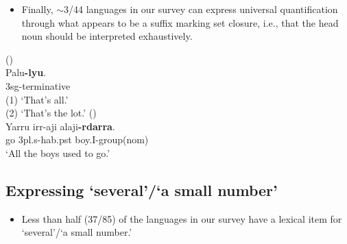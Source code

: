 \documentclass{article}
\makeatletter
\newcommand{\ofy}{/85} %
\makeatother
\begin{document}
\begin{itemize}
    \item Finally, $\sim$3/44 languages in our survey can express universal quantification through what appears to be a suffix marking set closure, i.e., that the head noun should be interpreted exhaustively. 
\end{itemize}

\begin{exe}
 (\citealt[158]{marsh92}) \\
\gll Palu\textbf{-lyu}.\\
3{\sc sg}-{\sc terminative}\\
\glt (1) `That's all.'\\
(2) `That's the lot.'
 (\citealt[80]{nordlinger98})\\
 \gll Yarru irr-aji  alaji\textbf{-rdarra}.\\
go  3{\sc pl.s-hab.pst} boy.I-{\sc group(nom)}\\
\glt `All the boys used to go.' 
\end{exe}


\subsection{Expressing `several'/`a small number'}

\begin{itemize}
    \item Less than half (37\ofy) of the languages in our survey have a lexical item for `several'/`a small number.'
\end{itemize}
\end{document}

